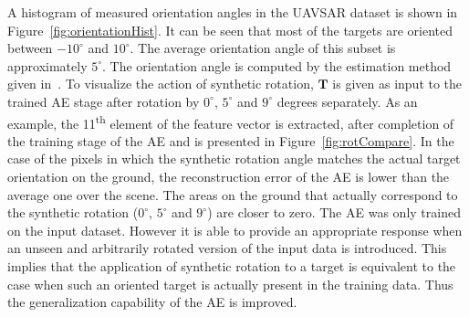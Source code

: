 A histogram of measured orientation angles in the UAVSAR dataset is shown in Figure~\ref{fig:orientationHist}.  It can be seen that most of the targets are oriented between $-10^\circ$  and $10^\circ$. 
The average orientation angle of this subset is approximately $5^\circ $. The orientation angle is computed by the estimation method given in~\cite{981347}. To visualize the action of synthetic rotation, $\mathbf{T}$ is given as input to the trained AE stage after rotation by $0^\circ$, $5^\circ$ and $9^\circ$ degrees separately. As an example, the 11\textsuperscript{th} element of the feature vector is extracted, after completion of the training stage of the AE and is presented in Figure~\ref{fig:rotCompare}. In the case  of the pixels in which the synthetic rotation angle matches the actual target orientation on the ground, the reconstruction error of the AE is lower than the average one over the scene. The areas on the ground that actually correspond to the synthetic rotation ($0^\circ$, $5^\circ$ and $9^\circ$) are closer to zero. The AE was only trained on the input dataset. However it is able to provide an appropriate  response when an unseen and arbitrarily rotated version of the input data is introduced. This implies that the application of synthetic rotation to a target is equivalent to the case when such an oriented target is actually present in the training data. Thus the generalization capability of the AE is improved. 







